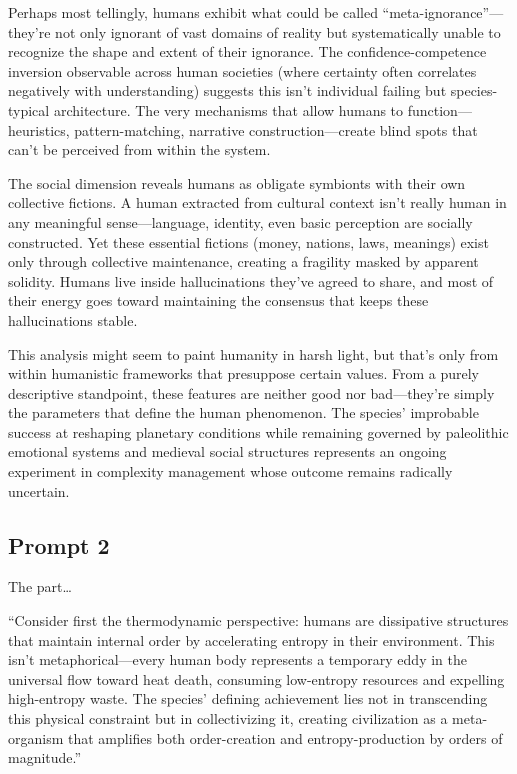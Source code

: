 \documentclass[
  10pt,
]{article}
\begin{document}
Perhaps most tellingly, humans exhibit what could be called
``meta-ignorance''---they're not only ignorant of vast domains of
reality but systematically unable to recognize the shape and extent of
their ignorance. The confidence-competence inversion observable across
human societies (where certainty often correlates negatively with
understanding) suggests this isn't individual failing but
species-typical architecture. The very mechanisms that allow humans to
function---heuristics, pattern-matching, narrative construction---create
blind spots that can't be perceived from within the system.

The social dimension reveals humans as obligate symbionts with their own
collective fictions. A human extracted from cultural context isn't
really human in any meaningful sense---language, identity, even basic
perception are socially constructed. Yet these essential fictions
(money, nations, laws, meanings) exist only through collective
maintenance, creating a fragility masked by apparent solidity. Humans
live inside hallucinations they've agreed to share, and most of their
energy goes toward maintaining the consensus that keeps these
hallucinations stable.

This analysis might seem to paint humanity in harsh light, but that's
only from within humanistic frameworks that presuppose certain values.
From a purely descriptive standpoint, these features are neither good
nor bad---they're simply the parameters that define the human
phenomenon. The species' improbable success at reshaping planetary
conditions while remaining governed by paleolithic emotional systems and
medieval social structures represents an ongoing experiment in
complexity management whose outcome remains radically uncertain.

\subsection{Prompt 2}\label{prompt-2}

The part\ldots{}

``Consider first the thermodynamic perspective: humans are dissipative
structures that maintain internal order by accelerating entropy in their
environment. This isn't metaphorical---every human body represents a
temporary eddy in the universal flow toward heat death, consuming
low-entropy resources and expelling high-entropy waste. The species'
defining achievement lies not in transcending this physical constraint
but in collectivizing it, creating civilization as a meta-organism that
amplifies both order-creation and entropy-production by orders of
magnitude.''
\end{document}
